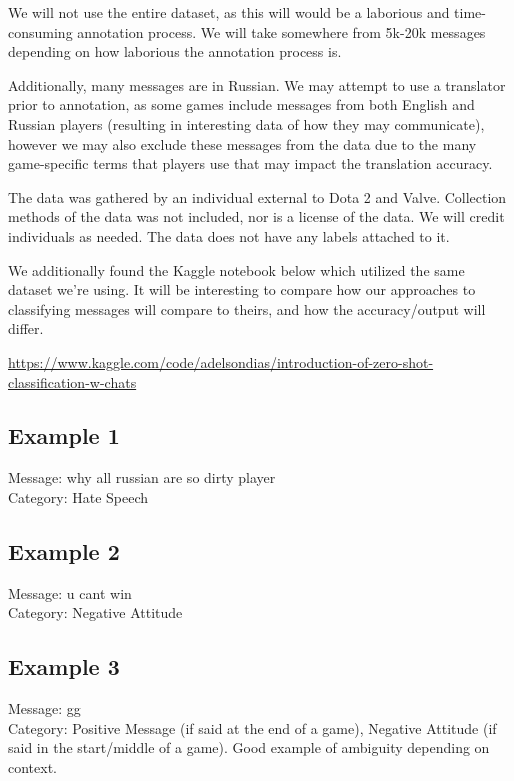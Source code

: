 \documentclass[11pt, letterpaper, notitlepage]{Article}
\begin{document}
	We will not use the entire dataset, as this will would be a laborious and time-consuming annotation process. We will take somewhere from 5k-20k messages depending on how laborious the annotation process is.
	
	Additionally, many messages are in Russian. We may attempt to use a translator prior to annotation, as some games include messages from both English and Russian players (resulting in interesting data of how they may communicate), however we may also exclude these messages from the data due to the many game-specific terms that players use that may impact the translation accuracy.
 	
	The data was gathered by an individual external to Dota 2 and Valve. Collection methods of the data was not included, nor is a license of the data. We will credit individuals as needed. The data does not have any labels attached to it.
	
	We additionally found the Kaggle notebook below which utilized the same dataset we're using. It will be interesting to compare how our approaches to classifying messages will compare to theirs, and how the accuracy/output will differ.
	
\begin{center}
\href{https://www.kaggle.com/code/adelsondias/introduction-of-zero-shot-classification-w-chats}{https://www.kaggle.com/code/adelsondias/introduction-of-zero-shot-classification-w-chats}
\end{center}
 	
\subsection{Example 1}

Message: why all russian are so dirty player\\
Category: Hate Speech

\subsection{Example 2}

Message: u cant win\\
Category: Negative Attitude

\subsection{Example 3}

Message: gg\\
Category: Positive Message (if said at the end of a game), Negative Attitude (if said in the start/middle of a game). Good example of ambiguity depending on context.
\end{document}
